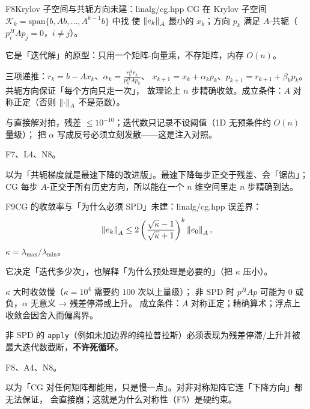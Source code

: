 \begin{know}{F8}{Krylov 子空间与共轭方向}{未建：linalg/cg.hpp}
 CG 在 Krylov 子空间 $\mathcal K_k=\mathrm{span}\{b,Ab,\dots,A^{k-1}b\}$ 中找
使 $\left\lVert e_k\right\rVert_{A}$ 最小的 $x_k$；方向 $p_k$ 满足 $A$-共轭（$p_i^{H}Ap_j=0$，$i\ne j$）。

 它是「迭代解」的原型：只用一个矩阵-向量乘，不存矩阵，内存 $O(n)$。

 三项递推：$r_k=b-Ax_k$、$\alpha_k=\frac{r_k^{H}r_k}{p_k^{H}Ap_k}$、
$x_{k+1}=x_k+\alpha_kp_k$、$p_{k+1}=r_{k+1}+\beta_kp_k$。共轭方向保证「每个方向只走一次」，
故理论上 $n$ 步精确收敛。成立条件：$A$ 对称正定（否则 $\left\lVert \cdot\right\rVert_{A}$ 不是范数）。

 与直接解对拍，残差 $\le10^{-10}$；迭代数只记录不设阈值（1D 无预条件约 $O(n)$ 量级）；
把 $\alpha$ 写成反号必须立刻发散——这是注入对照。

 F7、L4、N8。

 以为「共轭梯度就是最速下降的改进版」。最速下降每步正交于残差、会「锯齿」；
CG 每步 $A$-正交于所有历史方向，所以能在一个 $n$ 维空间里走 $n$ 步精确到达。
\end{know}

\begin{know}{F9}{CG 的收敛率与「为什么必须 SPD」}{未建：linalg/cg.hpp}
 误差界：
\[
\left\lVert e_k\right\rVert_{A}\le2\left(\frac{\sqrt\kappa-1}{\sqrt\kappa+1}\right)^{k}\left\lVert e_0\right\rVert_{A},
\]
$\kappa=\lambda_{\max}/\lambda_{\min}$。

 它决定「迭代多少次」，也解释「为什么预处理是必要的」（把 $\kappa$ 压小）。

 $\kappa$ 大时收敛慢（$\kappa=10^{4}$ 需要约 $100$ 次以上量级）；
非 SPD 时 $p^{H}Ap$ 可能为 0 或负，$\alpha$ 无意义 → 残差停滞或上升。
成立条件：$A$ 对称正定；精确算术；浮点上收敛会因舍入而偏离界。

 非 SPD 的 \texttt{apply}（例如未加边界的纯拉普拉斯）必须表现为残差停滞/上升并被
最大迭代数截断，\textbf{不许死循环}。

 F8、A4、N8。

 以为「CG 对任何矩阵都能用，只是慢一点」。对非对称矩阵它连「下降方向」都无法保证，
会直接崩；这就是为什么对称性（F5）是硬约束。
\end{know}
